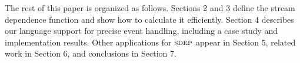 The rest of this paper is organized as follows.  Sections 2 and 3
define the stream dependence function and show how to calculate it
efficiently.  Section 4 describes our language support for precise
event handling, including a case study and implementation results.
Other applications for $\textsc{sdep}$ appear in Section 5, related work in
Section 6, and conclusions in Section 7.


				   
